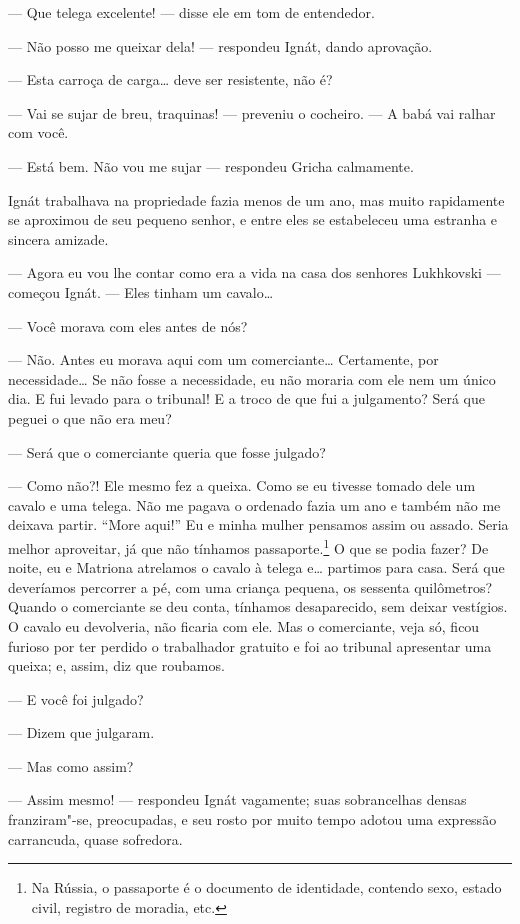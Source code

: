 --- Que telega excelente! --- disse ele em tom de entendedor.

--- Não posso me queixar dela! --- respondeu Ignát, dando aprovação.

--- Esta carroça de carga\ldots{} deve ser resistente, não é?

--- Vai se sujar de breu, traquinas! --- preveniu o cocheiro. --- A babá
vai ralhar com você.

--- Está bem. Não vou me sujar --- respondeu Gricha calmamente.

Ignát trabalhava na propriedade fazia menos de um ano, mas muito
rapidamente se aproximou de seu pequeno senhor, e entre eles se
estabeleceu uma estranha e sincera amizade.

--- Agora eu vou lhe contar como era a vida na casa dos senhores
Lukhkovski --- começou Ignát. --- Eles tinham um cavalo\ldots{}

--- Você morava com eles antes de nós?

--- Não. Antes eu morava aqui com um comerciante\ldots{} Certamente, por
necessidade\ldots{} Se não fosse a necessidade, eu não moraria com ele nem um
único dia. E fui levado para o tribunal! E a troco de que fui a
julgamento? Será que peguei o que não era meu?

--- Será que o comerciante queria que fosse julgado?

--- Como não?! Ele mesmo fez a queixa. Como se eu tivesse tomado dele um
cavalo e uma telega. Não me pagava o ordenado fazia um ano e também não
me deixava partir. ``More aqui!'' Eu e minha mulher pensamos assim ou
assado. Seria melhor aproveitar, já que não tínhamos
passaporte.\footnote{Na Rússia, o passaporte é o documento de
  identidade, contendo sexo, estado civil, registro de moradia, etc.} O que se podia fazer? De noite, eu e Matriona atrelamos o
cavalo à telega e\ldots{} partimos para casa. Será que deveríamos percorrer a
pé, com uma criança pequena, os sessenta quilômetros? Quando o
comerciante se deu conta, tínhamos desaparecido, sem deixar vestígios. O
cavalo eu devolveria, não ficaria com ele. Mas o comerciante, veja só,
ficou furioso por ter perdido o trabalhador gratuito e foi ao tribunal
apresentar uma queixa; e, assim, diz que roubamos.

--- E você foi julgado?

--- Dizem que julgaram.

--- Mas como assim?

--- Assim mesmo! --- respondeu Ignát vagamente; suas sobrancelhas densas
franziram"-se, preocupadas, e seu rosto por muito tempo adotou uma
expressão carrancuda, quase sofredora.

